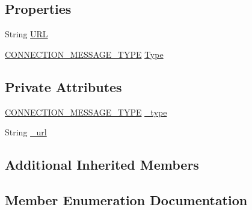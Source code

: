 \subsection*{Properties}
\begin{DoxyCompactItemize}
\item 
String \hyperlink{class_web_analyzer_1_1_models_1_1_message_model_1_1_connection_message_afc9df7636f98ce36f983c89db64f1c6a}{U\+R\+L}
\item 
\hyperlink{class_web_analyzer_1_1_models_1_1_message_model_1_1_connection_message_a0b8ebc456d3aed9c51235f2a1a1a1cdb}{C\+O\+N\+N\+E\+C\+T\+I\+O\+N\+\_\+\+M\+E\+S\+S\+A\+G\+E\+\_\+\+T\+Y\+P\+E} \hyperlink{class_web_analyzer_1_1_models_1_1_message_model_1_1_connection_message_a74c569109e3a9d19130c36fa9628a5f5}{Type}
\end{DoxyCompactItemize}
\subsection*{Private Attributes}
\begin{DoxyCompactItemize}
\item 
\hyperlink{class_web_analyzer_1_1_models_1_1_message_model_1_1_connection_message_a0b8ebc456d3aed9c51235f2a1a1a1cdb}{C\+O\+N\+N\+E\+C\+T\+I\+O\+N\+\_\+\+M\+E\+S\+S\+A\+G\+E\+\_\+\+T\+Y\+P\+E} \hyperlink{class_web_analyzer_1_1_models_1_1_message_model_1_1_connection_message_abb086bc753b39762aede8191821e72cb}{\+\_\+type}
\item 
String \hyperlink{class_web_analyzer_1_1_models_1_1_message_model_1_1_connection_message_a8b546b2299ebc28fbe93f158a7e1742a}{\+\_\+url}
\end{DoxyCompactItemize}
\subsection*{Additional Inherited Members}


\subsection{Member Enumeration Documentation}
\hypertarget{class_web_analyzer_1_1_models_1_1_message_model_1_1_connection_message_a0b8ebc456d3aed9c51235f2a1a1a1cdb}{}
